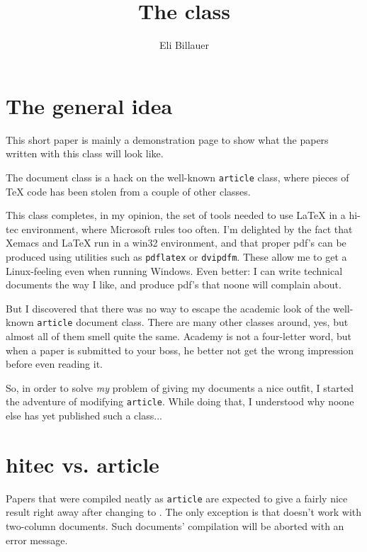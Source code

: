 \documentclass{hitec}
\title{The \HT class}
\author{Eli Billauer}
\newcommand{\HT}{\textsc{\raisebox{0.1em}{h}\raisebox{-0.1em}{i}%
	\raisebox{0.1em}{t}\raisebox{-0.1em}{e}\raisebox{0.1em}{c} }}
\begin{document}
\maketitle
\section{The general idea}
This short paper is mainly a demonstration page to show what the papers written with
this class will look like.

The document class is a hack on the well-known \texttt{article} class, where pieces of \TeX
\hspace{0pt} code has been stolen from a couple of other classes.

This class completes, in my opinion, the set of tools needed to use \LaTeX \hspace{0pt}
in a hi-tec environment, where Microsoft rules too often. I'm delighted by the fact
that Xemacs and \LaTeX \hspace{0pt} run in a win32 environment, and that proper pdf's
can be produced using utilities such as \texttt{pdflatex} or \texttt{dvipdfm}.
These allow me to get a Linux-feeling even when running Windows. Even better: I can
write technical documents the way I like, and produce pdf's that noone will complain about.

But I discovered that there was no way to escape the academic look of the well-known
\texttt{article} document class. There are many other classes around, yes, but almost
all of them smell quite the same. Academy is not a four-letter word, but when a paper is
submitted to your boss, he better not get the wrong impression before even reading it.

So, in order to solve \emph{my} problem of giving my documents a nice outfit, I started
the adventure of modifying \texttt{article}. While doing that, I understood why noone
else has yet published such a class...

\section{hitec vs. article}
Papers that were compiled neatly as \texttt{article} are expected to give a fairly nice
result right away after changing to \HT. The only exception is that \HT doesn't work
with two-column documents. Such documents' compilation will be aborted with an error
message.
\end{document}
